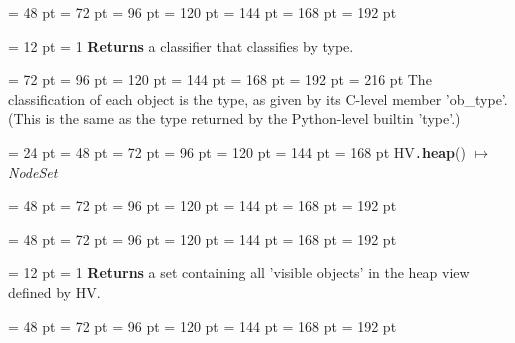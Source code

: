 {{{{\par \noindent  \leftskip = 48 pt  \leftmargini = 72 pt  \leftmarginii = 96 pt  \leftmarginiii = 120 pt  \leftmarginiv = 144 pt  \leftmarginv = 168 pt  \leftmarginvi = 192 pt {\par \noindent
{\par \pagebreak[3.100000] \noindent \hangindent = 12 pt \hangafter = 1 
{\bf Returns \/} a classifier that classifies by type.\par}
{\par \noindent  \leftskip = 72 pt  \leftmargini = 96 pt  \leftmarginii = 120 pt  \leftmarginiii = 144 pt  \leftmarginiv = 168 pt  \leftmarginv = 192 pt  \leftmarginvi = 216 pt 
The classification of each object is the type, as given by its
C-level member 'ob{\_}type'. (This is the same as the type returned
by the Python-level builtin 'type'.)
\par}
\par}
\par}
\par}
\par}
{\par \noindent  \leftskip = 24 pt  \leftmargini = 48 pt  \leftmarginii = 72 pt  \leftmarginiii = 96 pt  \leftmarginiv = 120 pt  \leftmarginv = 144 pt  \leftmarginvi = 168 pt HV{\tt .\/}{\bf {\large {\bf heap\/}}\/}() \(\mapsto \)  {\em NodeSet\/}{\par \noindent
{\par \noindent  \leftskip = 48 pt  \leftmargini = 72 pt  \leftmarginii = 96 pt  \leftmarginiii = 120 pt  \leftmarginiv = 144 pt  \leftmarginv = 168 pt  \leftmarginvi = 192 pt {\par \noindent
\par}
\par}
{\par \noindent  \leftskip = 48 pt  \leftmargini = 72 pt  \leftmarginii = 96 pt  \leftmarginiii = 120 pt  \leftmarginiv = 144 pt  \leftmarginv = 168 pt  \leftmarginvi = 192 pt {\par \noindent
{\par \pagebreak[3.100000] \noindent \hangindent = 12 pt \hangafter = 1 
{\bf Returns \/} a set containing all 'visible objects' in the heap view
defined by HV.\par}
\par}
\par}
{\par \noindent  \leftskip = 48 pt  \leftmargini = 72 pt  \leftmarginii = 96 pt  \leftmarginiii = 120 pt  \leftmarginiv = 144 pt  \leftmarginv = 168 pt  \leftmarginvi = 192 pt {\par \noindent
}}}}}
